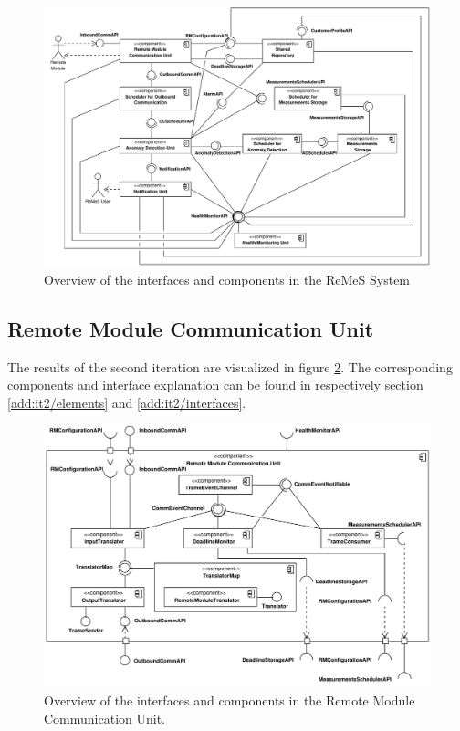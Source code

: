 \begin{figure}[H]
	\begin{centering}
		\includegraphics[width=1.4\textwidth,angle=90]{figs/add-it1-interfaces.pdf}
		\caption{Overview of the interfaces and components in the ReMeS
		System}
		\label{fig:final-architecture/it1}
	\end{centering}
\end{figure}

\subsection{Remote Module Communication Unit}

\npar The results of the second iteration are visualized in figure
\ref{fig:final-architecture/it2}. The corresponding components and interface
explanation can be found in respectively section \ref{add:it2/elements} and
\ref{add:it2/interfaces}.

\begin{figure}
	\begin{centering}
		\includegraphics[width=\textwidth]{figs/add-it2-interfaces.pdf}
		\caption{Overview of the interfaces and components in the Remote
		Module Communication Unit.}
		\label{fig:final-architecture/it2}
	\end{centering}
\end{figure}

